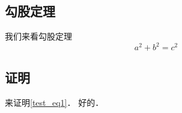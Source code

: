 
\subsection{勾股定理}
我们来看勾股定理
\begin{equation}\label{test_eq1}
a^2 + b^2 = c^2
\end{equation}

\subsection{证明}
来证明\autoref{test_eq1}． 好的．
